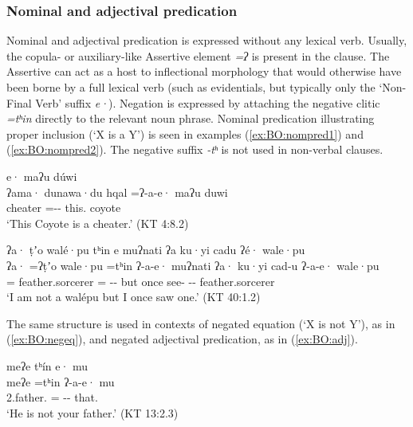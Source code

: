 \documentclass[output=paper,modfonts,nonflat,colorlinks,citecolor=brown]{langscibook}
\begin{document}
\subsubsection{Nominal and adjectival predication}\label{sec:BO:nomadj}
Nominal and adjectival predication is expressed without any lexical verb. Usually, the copula- or auxiliary-like Assertive element \textit{=ʔ} is present in the clause. The Assertive can act as a host to inflectional morphology that would otherwise have been borne by a full lexical verb (such as evidentials, but typically only the `Non-Final Verb' suffix \textit{e·}). Negation is expressed by attaching the negative clitic \textit{=tʰin} directly to the relevant noun phrase.  Nominal predication illustrating proper inclusion (`X is a Y') is seen in examples (\ref{ex:BO:nompred1}) and (\ref{ex:BO:nompred2}). The negative suffix \textit{-tʰ} is not used in non-verbal clauses.


{%
\ea 
\label{ex:BO:nompred1}
 e· maʔu dúwi\\
    {ʔama· dunawa·du hqal} =ʔ-a-e· maʔu duwi\\
    cheater =-- this. coyote\\
\glt `This Coyote is a cheater.' ({KT 4:8.2})\\
\z
}%

{%
\ea 
\label{ex:BO:nompred2}
\glll ʔa· ṭʼo walé·pu tʰin e muʔnati ʔa ku·yi cadu ʔé· wale·pu\\
    ʔa· =ʔṭʼo wale·pu =tʰin ʔ-a-e· muʔnati ʔa· ku·yi cad-u ʔ-a-e· wale·pu\\
     = feather.sorcerer = -- but  once see- -- feather.sorcerer\\
\glt `I am not a walépu but I once saw one.' ({KT 40:1.2})\\
\z
}

The same structure is used in contexts of negated equation (`X is not Y'), as in (\ref{ex:BO:negeq}), and negated adjectival predication, as in (\ref{ex:BO:adj}).

\ea 
\label{ex:BO:negeq}
\glll meʔe tʰín e· mu\\
      meʔe =tʰin ʔ-a-e· mu\\
      2.father. = -- that.\\
\glt `He is not your father.' ({KT 13:2.3})\\
\z
\end{document}
